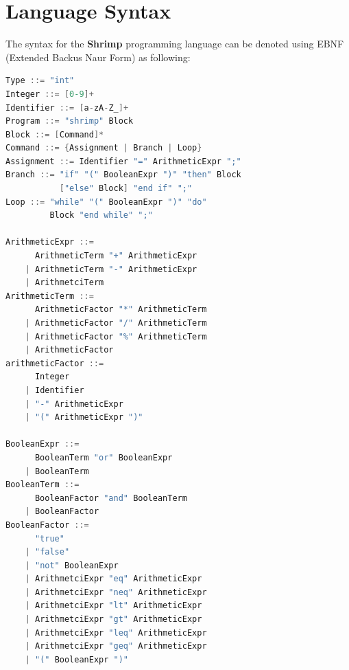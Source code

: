 \documentclass[12pt,a4paper]{article}
\begin{document}
\section*{Language Syntax}
The syntax for the \textbf{Shrimp} programming language can be denoted using EBNF (Extended Backus Naur Form) as following:
\begin{lstlisting}[language=C, style=ebnf-style]
Type ::= "int"
Integer ::= [0-9]+
Identifier ::= [a-zA-Z_]+
Program ::= "shrimp" Block
Block ::= [Command]*
Command ::= {Assignment | Branch | Loop}
Assignment ::= Identifier "=" ArithmeticExpr ";"
Branch ::= "if" "(" BooleanExpr ")" "then" Block
           ["else" Block] "end if" ";"
Loop ::= "while" "(" BooleanExpr ")" "do"
         Block "end while" ";"

ArithmeticExpr ::=
      ArithmeticTerm "+" ArithmeticExpr
    | ArithmeticTerm "-" ArithmeticExpr
    | ArithmetciTerm
ArithmeticTerm ::=
      ArithmeticFactor "*" ArithmeticTerm
    | ArithmeticFactor "/" ArithmeticTerm
    | ArithmeticFactor "%" ArithmeticTerm
    | ArithmeticFactor
arithmeticFactor ::=
      Integer
    | Identifier
    | "-" ArithmeticExpr
    | "(" ArithmeticExpr ")"

BooleanExpr ::=
      BooleanTerm "or" BooleanExpr
    | BooleanTerm
BooleanTerm ::=
      BooleanFactor "and" BooleanTerm
    | BooleanFactor
BooleanFactor ::=
      "true"
    | "false"
    | "not" BooleanExpr
    | ArithmetciExpr "eq" ArithmeticExpr
    | ArithmetciExpr "neq" ArithmeticExpr
    | ArithmetciExpr "lt" ArithmeticExpr
    | ArithmetciExpr "gt" ArithmeticExpr
    | ArithmetciExpr "leq" ArithmeticExpr
    | ArithmetciExpr "geq" ArithmeticExpr
    | "(" BooleanExpr ")"
\end{lstlisting}
\end{document}
